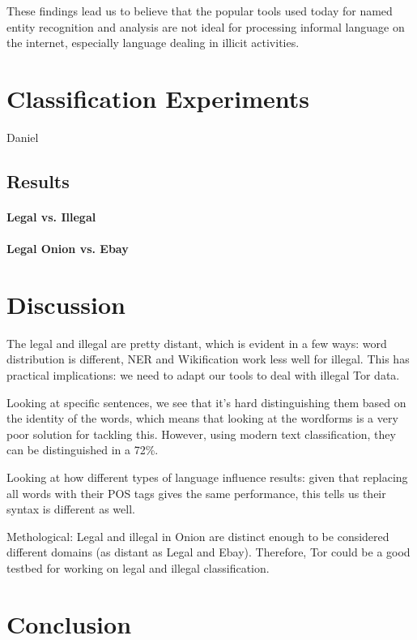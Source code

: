 \documentclass[11pt,a4paper]{article}
\begin{document}
These findings lead us to believe that the popular tools used today
for named entity recognition and analysis are not ideal for processing
informal language on the internet, especially language dealing in
illicit activities. 

\section{Classification Experiments}

Daniel

\subsection{Results}

\paragraph{Legal vs. Illegal}

\paragraph{Legal Onion vs. Ebay}


\section{Discussion}

The legal and illegal are pretty distant, which is evident in a few ways: word distribution is different, NER and Wikification work less well
for illegal. This has practical implications: we need to adapt our tools to deal with illegal Tor data. 

Looking at specific sentences, we see that it's hard distinguishing them based on the identity of the words, which means that
looking at the wordforms is a very poor solution for tackling this. However, using modern text classification, they can be distinguished
in a 72\%. 

Looking at how different types of language influence results: given that replacing all words with their POS tags gives
the same performance, this tells us their syntax is different as well.

Methological: Legal and illegal in Onion are distinct enough to be considered different domains (as distant as Legal and Ebay). 
Therefore, Tor could be a good testbed for working on legal and illegal classification.


\section{Conclusion}
 














\end{document}
